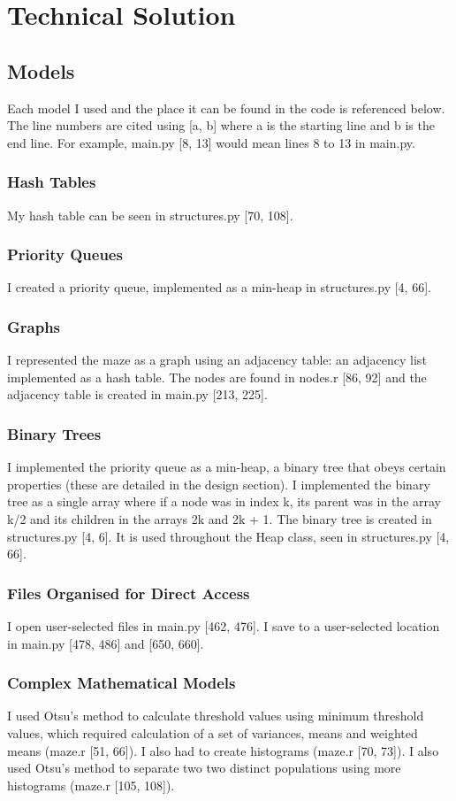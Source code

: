 \documentclass[titlepage]{article}
\begin{document}
\pagebreak
\section{Technical Solution}

\subsection{Models}
Each model I used and the place it can be found in the code is referenced below. The line numbers are cited using [a, b] where a is the starting line and b is the end line. For example, main.py [8, 13] would mean lines 8 to 13 in main.py.
\subsubsection{Hash Tables}
My hash table can be seen in structures.py [70, 108].
\subsubsection{Priority Queues}
I created a priority queue, implemented as a min-heap in structures.py [4, 66].
\subsubsection{Graphs}
I represented the maze as a graph using an adjacency table: an adjacency list implemented as a hash table. The nodes are found in nodes.r [86, 92] and the adjacency table is created in main.py [213, 225].
\subsubsection{Binary Trees}
I implemented the priority queue as a min-heap, a binary tree that obeys certain properties (these are detailed in the design section). I implemented the binary tree as a single array where if a node was in index k, its parent was in the array k/2 and its children in the arrays 2k and 2k + 1. The binary tree is created in structures.py [4, 6]. It is used throughout the Heap class, seen in structures.py [4, 66].
\subsubsection{Files Organised for Direct Access}
I open user-selected files in main.py [462, 476]. I save to a user-selected location in main.py [478, 486] and [650, 660]. 
\subsubsection{Complex Mathematical Models}
I used Otsu's method to calculate threshold values using minimum threshold values, which required calculation of a set of variances, means and weighted means (maze.r [51, 66]). I also had to create histograms (maze.r [70, 73]). I also used Otsu's method to separate two two distinct populations using more histograms (maze.r [105, 108]).
\end{document}
